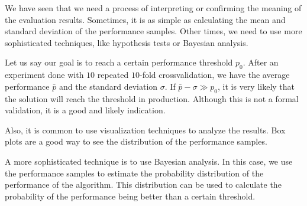 We have seen that we need a process of interpreting or confirming the meaning of the
evaluation results.
Sometimes, it is as simple as calculating the mean and standard deviation of the
performance samples.  Other times, we need to use more sophisticated techniques, like
hypothesis tests or Bayesian analysis.

Let us say our goal is to reach a certain performance threshold $p_0$.  After an
experiment done with $10$ repeated $10$-fold \gls{crossvalidation}, we have the average
performance $\bar{p}$ and the standard deviation $\sigma$.  If $\bar{p} - \sigma \gg
p_0$, it is very likely that the solution will reach the threshold in production.
Although this is not a formal validation, it is a good and likely indication.

Also, it is common to use visualization techniques to analyze the results.  Box plots are
a good way to see the distribution of the performance samples.

A more sophisticated technique is to use Bayesian analysis.  In this case, we use the
performance samples to estimate the probability distribution of the performance of the
algorithm.  This distribution can be used to calculate the probability of the performance
being better than a certain threshold.

